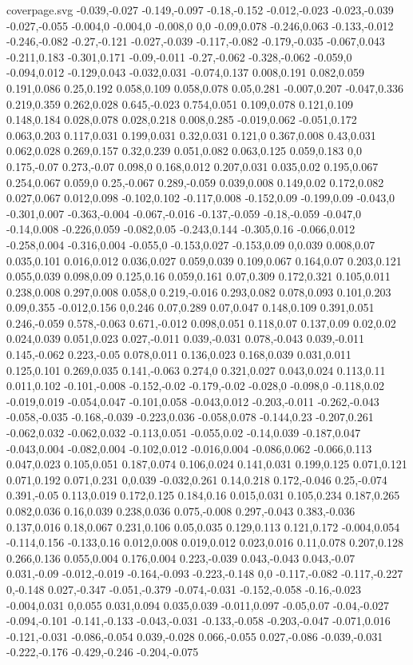 \begin{filecontents}[noheader]{coverpage.svg}
-0.039,-0.027 -0.149,-0.097 -0.18,-0.152 -0.012,-0.023 -0.023,-0.039 -0.027,-0.055 -0.004,0 -0.004,0 -0.008,0 0,0 -0.09,0.078 -0.246,0.063 -0.133,-0.012 -0.246,-0.082 -0.27,-0.121 -0.027,-0.039 -0.117,-0.082 -0.179,-0.035 -0.067,0.043 -0.211,0.183 -0.301,0.171 -0.09,-0.011 -0.27,-0.062 -0.328,-0.062 -0.059,0 -0.094,0.012 -0.129,0.043 -0.032,0.031 -0.074,0.137 0.008,0.191 0.082,0.059 0.191,0.086 0.25,0.192 0.058,0.109 0.058,0.078 0.05,0.281 -0.007,0.207 -0.047,0.336 0.219,0.359 0.262,0.028 0.645,-0.023 0.754,0.051 0.109,0.078 0.121,0.109 0.148,0.184 0.028,0.078 0.028,0.218 0.008,0.285 -0.019,0.062 -0.051,0.172 0.063,0.203 0.117,0.031 0.199,0.031 0.32,0.031 0.121,0 0.367,0.008 0.43,0.031 0.062,0.028 0.269,0.157 0.32,0.239 0.051,0.082 0.063,0.125 0.059,0.183 0,0 0.175,-0.07 0.273,-0.07 0.098,0 0.168,0.012 0.207,0.031 0.035,0.02 0.195,0.067 0.254,0.067 0.059,0 0.25,-0.067 0.289,-0.059 0.039,0.008 0.149,0.02 0.172,0.082 0.027,0.067 0.012,0.098 -0.102,0.102 -0.117,0.008 -0.152,0.09 -0.199,0.09 -0.043,0 -0.301,0.007 -0.363,-0.004 -0.067,-0.016 -0.137,-0.059 -0.18,-0.059 -0.047,0 -0.14,0.008 -0.226,0.059 -0.082,0.05 -0.243,0.144 -0.305,0.16 -0.066,0.012 -0.258,0.004 -0.316,0.004 -0.055,0 -0.153,0.027 -0.153,0.09 0,0.039 0.008,0.07 0.035,0.101 0.016,0.012 0.036,0.027 0.059,0.039 0.109,0.067 0.164,0.07 0.203,0.121 0.055,0.039 0.098,0.09 0.125,0.16 0.059,0.161 0.07,0.309 0.172,0.321 0.105,0.011 0.238,0.008 0.297,0.008 0.058,0 0.219,-0.016 0.293,0.082 0.078,0.093 0.101,0.203 0.09,0.355 -0.012,0.156 0,0.246 0.07,0.289 0.07,0.047 0.148,0.109 0.391,0.051 0.246,-0.059 0.578,-0.063 0.671,-0.012 0.098,0.051 0.118,0.07 0.137,0.09 0.02,0.02 0.024,0.039 0.051,0.023 0.027,-0.011 0.039,-0.031 0.078,-0.043 0.039,-0.011 0.145,-0.062 0.223,-0.05 0.078,0.011 0.136,0.023 0.168,0.039 0.031,0.011 0.125,0.101 0.269,0.035 0.141,-0.063 0.274,0 0.321,0.027 0.043,0.024 0.113,0.11 0.011,0.102 -0.101,-0.008 -0.152,-0.02 -0.179,-0.02 -0.028,0 -0.098,0 -0.118,0.02 -0.019,0.019 -0.054,0.047 -0.101,0.058 -0.043,0.012 -0.203,-0.011 -0.262,-0.043 -0.058,-0.035 -0.168,-0.039 -0.223,0.036 -0.058,0.078 -0.144,0.23 -0.207,0.261 -0.062,0.032 -0.062,0.032 -0.113,0.051 -0.055,0.02 -0.14,0.039 -0.187,0.047 -0.043,0.004 -0.082,0.004 -0.102,0.012 -0.016,0.004 -0.086,0.062 -0.066,0.113 0.047,0.023 0.105,0.051 0.187,0.074 0.106,0.024 0.141,0.031 0.199,0.125 0.071,0.121 0.071,0.192 0.071,0.231 0,0.039 -0.032,0.261 0.14,0.218 0.172,-0.046 0.25,-0.074 0.391,-0.05 0.113,0.019 0.172,0.125 0.184,0.16 0.015,0.031 0.105,0.234 0.187,0.265 0.082,0.036 0.16,0.039 0.238,0.036 0.075,-0.008 0.297,-0.043 0.383,-0.036 0.137,0.016 0.18,0.067 0.231,0.106 0.05,0.035 0.129,0.113 0.121,0.172 -0.004,0.054 -0.114,0.156 -0.133,0.16 0.012,0.008 0.019,0.012 0.023,0.016 0.11,0.078 0.207,0.128 0.266,0.136 0.055,0.004 0.176,0.004 0.223,-0.039 0.043,-0.043 0.043,-0.07 0.031,-0.09 -0.012,-0.019 -0.164,-0.093 -0.223,-0.148 0,0 -0.117,-0.082 -0.117,-0.227 0,-0.148 0.027,-0.347 -0.051,-0.379 -0.074,-0.031 -0.152,-0.058 -0.16,-0.023 -0.004,0.031 0,0.055 0.031,0.094 0.035,0.039 -0.011,0.097 -0.05,0.07 -0.04,-0.027 -0.094,-0.101 -0.141,-0.133 -0.043,-0.031 -0.133,-0.058 -0.203,-0.047 -0.071,0.016 -0.121,-0.031 -0.086,-0.054 0.039,-0.028 0.066,-0.055 0.027,-0.086 -0.039,-0.031 -0.222,-0.176 -0.429,-0.246 -0.204,-0.075 
\end{filecontents}
